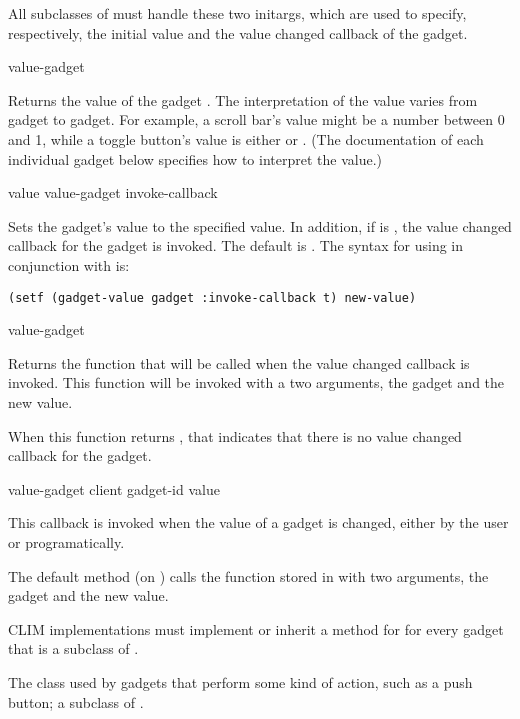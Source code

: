 
All subclasses of  must handle these two initargs, which are
used to specify, respectively, the initial value and the value changed callback
of the gadget.

 {value-gadget}

Returns the value of the gadget .  The interpretation of the
value varies from gadget to gadget.  For example, a scroll bar's value might be
a number between 0 and 1, while a toggle button's value is either  or
.  (The documentation of each individual gadget below specifies how to
interpret the value.)

 {value value-gadget \key invoke-callback}

Sets the gadget's value to the specified value.  In addition, if
 is , the value changed callback for the
gadget is invoked.  The default is .  The syntax for using
 in conjunction with  is:

\begin{verbatim}
(setf (gadget-value gadget :invoke-callback t) new-value)
\end{verbatim}

 {value-gadget}

Returns the function that will be called when the value changed callback is
invoked.  This function will be invoked with a two arguments, the gadget and
the new value.

When this function returns , that indicates that there is no value
changed callback for the gadget.

 {value-gadget client gadget-id value}

This callback is invoked when the value of a gadget is changed, either by the
user or programatically.

The default method (on ) calls the function stored in
 with two arguments, the gadget and the new
value.

CLIM implementations must implement or inherit a method for
 for every gadget that is a subclass of
.



The class used by gadgets that perform some kind of action, such as a push
button; a subclass of .

